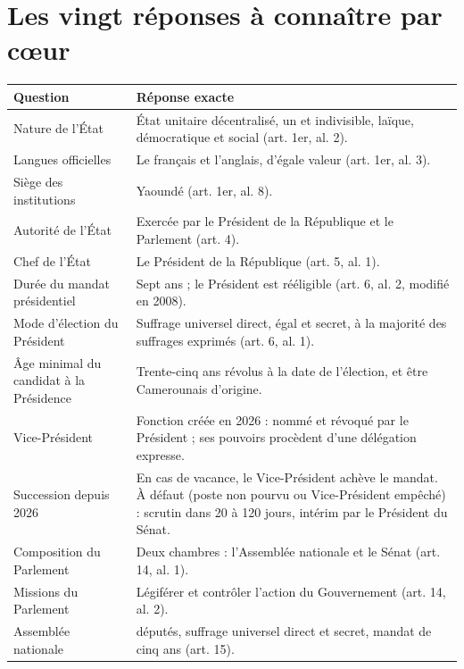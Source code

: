 \documentclass[11pt,a4paper,oneside]{report}
\begin{document}
\section{Les vingt réponses à connaître par cœur}
\begin{longtable}{>{\raggedright\arraybackslash}p{} >{\raggedright\arraybackslash}p{}}
\toprule
\textbf{\color{navy}Question} & \textbf{\color{navy}Réponse exacte} \\
\midrule\endhead
Nature de l'État & État unitaire décentralisé, un et indivisible, laïque, démocratique et social (art. 1er, al. 2). \\
\addlinespace[1pt]
Langues officielles & Le français et l'anglais, d'égale valeur (art. 1er, al. 3). \\
\addlinespace[1pt]
Siège des institutions & Yaoundé (art. 1er, al. 8). \\
\addlinespace[1pt]
Autorité de l'État & Exercée par le Président de la République et le Parlement (art. 4). \\
\addlinespace[1pt]
Chef de l'État & Le Président de la République (art. 5, al. 1). \\
\addlinespace[1pt]
Durée du mandat présidentiel & Sept ans ; le Président est rééligible (art. 6, al. 2, modifié en 2008). \\
\addlinespace[1pt]
Mode d'élection du Président & Suffrage universel direct, égal et secret, à la majorité des suffrages exprimés (art. 6, al. 1). \\
\addlinespace[1pt]
Âge minimal du candidat à la Présidence & Trente-cinq ans révolus à la date de l'élection, et être Camerounais d'origine. \\
\addlinespace[1pt]
Vice-Président & Fonction créée en 2026 : nommé et révoqué par le Président ; ses pouvoirs procèdent d'une délégation expresse. \\
\addlinespace[1pt]
Succession depuis 2026 & En cas de vacance, le Vice-Président achève le mandat. À défaut (poste non pourvu ou Vice-Président empêché) : scrutin dans 20 à 120 jours, intérim par le Président du Sénat. \\
\addlinespace[1pt]
Composition du Parlement & Deux chambres : l'Assemblée nationale et le Sénat (art. 14, al. 1). \\
\addlinespace[1pt]
Missions du Parlement & Légiférer et contrôler l'action du Gouvernement (art. 14, al. 2). \\
\addlinespace[1pt]
Assemblée nationale & 180 députés, suffrage universel direct et secret, mandat de cinq ans (art. 15). \\

\end{longtable}
\end{document}
